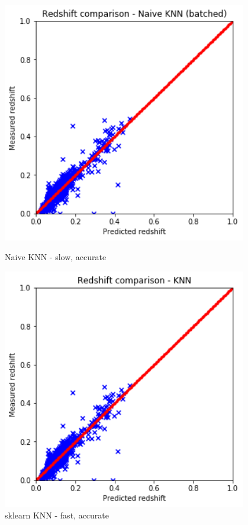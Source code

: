 \documentclass[a4paper,12pt]{article}
\begin{document}
\begin{figure}[H]
	\centering
	\begin{minipage}{0.5\textwidth}
		\centering
		\includegraphics[width=0.95\textwidth]{./algos1.png}
		\caption{ Naive KNN - slow, accurate }
	\end{minipage}\hfill
	\begin{minipage}{0.5\textwidth}
		\centering
		\includegraphics[width=0.95\textwidth]{./algos2.png}
		\caption{ sklearn KNN - fast, accurate }
	\end{minipage}
\end{figure}
\end{document}

